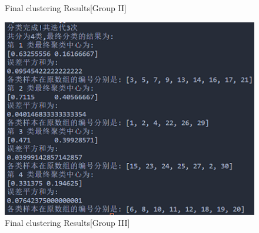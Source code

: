 \documentclass[homework]{IEEEtran}
\begin{document}
\begin{CJK}{UTF8}{gkai}
\begin{figure}[htb]
    \caption{Final clustering Results[Group II]}
    \label{fig11}
    \end{figure} \par
\begin{figure}[htb]
    \centerline{\includegraphics{Images/fig12.png}}
    \caption{Final clustering Results[Group III]}
    \label{fig12}
    \end{figure} \par


\end{CJK}
\end{document}
